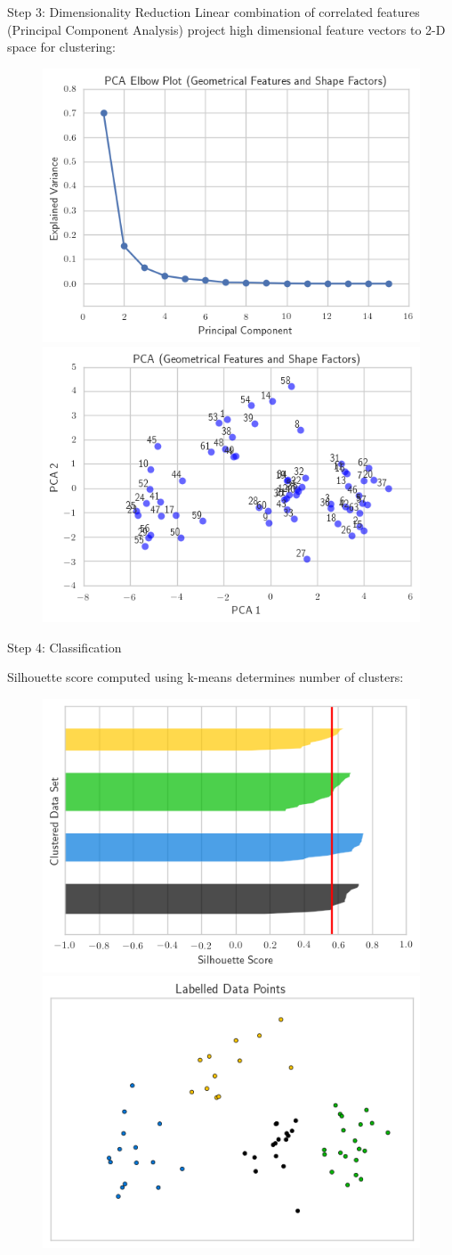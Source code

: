 \documentclass[final,hyperref={pdfpagelabels=false}]{beamer}
\begin{document}
\begin{frame}[t]
\begin{columns}[t]
\begin{column}{.33\textwidth}
\begin{block}{Step 3: Dimensionality Reduction}
Linear combination of correlated features (Principal Component Analysis) project high dimensional feature vectors to 2-D space for clustering:
\vspace{0.5em}

\begin{figure}
\includegraphics[width=0.44\linewidth]{pca_fig1}
\hspace{0.5cm}
\includegraphics[width=0.44\linewidth]{pca_fig3}
\end{figure}

\end{block}


\begin{block}{Step 4: Classification}

Silhouette score computed using k-means determines number of clusters:
\vspace{0.5em}

\begin{figure}
\includegraphics[width=0.44\linewidth]{silhouette_fig1.png}
\hspace{0.5cm}
\includegraphics[width=0.44\linewidth]{silhouette_fig2.png}
\end{figure}


\end{block}
\end{column}
\end{columns}
\end{frame}
\end{document}
